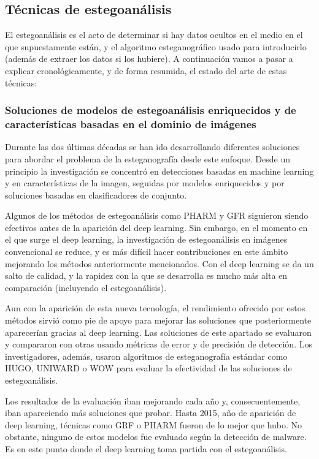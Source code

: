 \subsection{Técnicas de estegoanálisis}

El estegoanálisis es el acto de determinar si hay datos ocultos en el medio en el que supuestamente están, y el algoritmo esteganográfico usado para introducirlo (además de extraer los datos si los hubiere). A continuación vamos a pasar a explicar cronológicamente, y de forma resumida, el estado del arte de estas técnicas:

\subsubsection{Soluciones de modelos de estegoanálisis enriquecidos y de características basadas en el dominio de imágenes}

Durante las dos últimas décadas se han ido desarrollando diferentes soluciones para abordar el problema de la esteganografía desde este enfoque. Desde un principio la investigación se concentró en detecciones basadas en machine learning y en características de la imagen, seguidas por modelos enriquecidos y por soluciones basadas en clasificadores de conjunto. 

Algunos de los métodos de estegoanálisis como PHARM y GFR siguieron siendo efectivos antes de la aparición del deep learning. Sin embargo, en el momento en el que surge el deep learning, la investigación de estegoanálisis en imágenes convencional se reduce, y es más difícil hacer contribuciones en este ámbito mejorando los métodos anteriormente mencionados. Con el deep learning se da un salto de calidad, y la rapidez con la que se desarrolla es mucho más alta en comparación (incluyendo el estegoanálisis). %

Aun con la aparición de esta nueva tecnología, el rendimiento ofrecido por estos métodos sirvió como pie de apoyo para mejorar las soluciones que posteriormente aparecerían gracias al deep learning. Las soluciones de este apartado se evaluaron y compararon con otras usando métricas de error y de precisión de detección. Los investigadores, además, usaron algoritmos de esteganografía estándar como HUGO, UNIWARD o WOW para evaluar la efectividad de las soluciones de estegoanálisis.%

Los resultados de la evaluación iban mejorando cada año y, consecuentemente, iban apareciendo más soluciones que probar. Hasta 2015, año de aparición de deep learning, técnicas como GRF o PHARM fueron de lo mejor que hubo. No obstante, ninguno de estos modelos fue evaluado según la detección de malware. Es en este punto donde el deep learning toma partida con el estegoanálisis.

